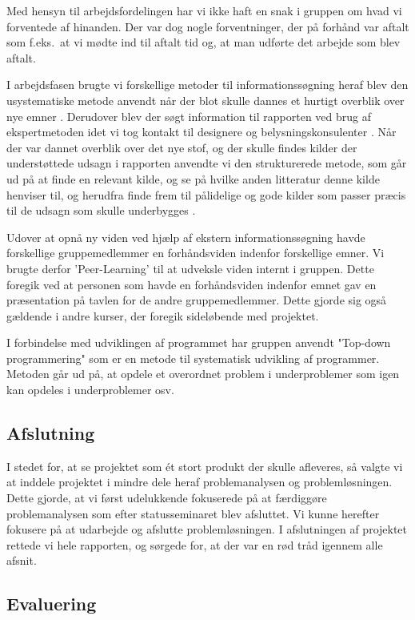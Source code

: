 Med hensyn til arbejdsfordelingen har vi ikke haft en snak i gruppen om hvad vi forventede af hinanden. Der var dog nogle forventninger, der på forhånd var aftalt som f.eks.\ at vi mødte ind til aftalt tid og, at man udførte det arbejde som blev aftalt. 

I arbejdsfasen brugte vi forskellige metoder til informationssøgning heraf blev den usystematiske metode anvendt når der blot skulle dannes et hurtigt overblik over nye emner \cite{SO_bog}. Derudover blev der søgt information til rapporten ved brug af ekspertmetoden idet vi tog kontakt til designere og belysningskonsulenter \cite{SO_bog}. Når der var dannet overblik over det nye stof, og der skulle findes kilder der understøttede udsagn i rapporten anvendte vi den strukturerede metode, som går ud på at finde en relevant kilde, og se på hvilke anden litteratur denne kilde henviser til, og herudfra finde frem til pålidelige og gode kilder som passer præcis til de udsagn som skulle underbygges \cite{SO_bog}. 

Udover at opnå ny viden ved hjælp af ekstern informationssøgning havde forskellige gruppemedlemmer en forhåndsviden indenfor forskellige emner. Vi brugte derfor 'Peer-Learning' til at udveksle viden internt i gruppen. Dette foregik ved at personen som havde en forhåndsviden indenfor emnet gav en præsentation på tavlen for de andre gruppemedlemmer. Dette gjorde sig også gældende i andre kurser, der foregik sideløbende med projektet.

I forbindelse med udviklingen af programmet har gruppen anvendt "Top-down programmering" som er en metode til systematisk udvikling af programmer. Metoden går ud på, at opdele et overordnet problem i underproblemer som igen kan opdeles i underproblemer osv.

\subsection{Afslutning}

I stedet for, at se projektet som ét stort produkt der skulle afleveres, så valgte vi at inddele projektet i mindre dele heraf problemanalysen og problemløsningen. Dette gjorde, at vi først udelukkende fokuserede på at færdiggøre problemanalysen som efter statusseminaret blev afsluttet. Vi kunne herefter fokusere på at udarbejde og afslutte problemløsningen. 
I afslutningen af projektet rettede vi hele rapporten, og sørgede for, at der var en rød tråd igennem alle afsnit.

\subsection{Evaluering}

